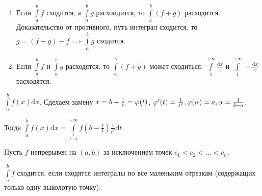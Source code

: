 \begin{remark}
    \begin{enumerate}
        \item Если  $\int\limits_a^b f$ сходится, а  $\int\limits_a^b g$ расхоидится, то  $\int\limits_a^b (f+g)$ расходится. Доказательство от противного, путь интеграл сходится, то  $g = (f+g)-f \implies \int\limits_a^b g$ сходится.
        \item Если $\int\limits_a^b f$ и  $\int\limits_a^b g$ расходятся, то  $\int\limits_a^b (f+g)$ может сходиться.  $\int\limits_1^{+\infty} \frac{\mathrm{d}x}{x}$ и $\int\limits_1^{+\infty} -\frac{\mathrm{d}x}{x}$ расходятся.
    \end{enumerate}
\end{remark}
\begin{remark}
    $\int\limits_a^b f(x) \mathrm{d}x$. Сделаем замену  $x = b - \frac{1}{t} = \varphi(t)$, $\varphi'(t) = \frac{1}{t^2}, \varphi(\alpha) = a, \alpha = \frac{1}{b-a}$.

    Тогда $\int\limits_a^b f(x) \mathrm{d}x = \int\limits_{\frac{1}{b-a}}^{+\infty} f(b-\frac{1}{t}) \frac{1}{t^2} \mathrm{d}t$.
\end{remark}

\begin{definition}
    Пусть $f$ непрерывен на  $(a, b)$ за исключением точек  $c_1 < c_2 < \ldots < c_n$.

    $\int\limits_a^b f$ сходится, если сходятся интегралы по все маленьким отрезкам (содержащих только одну выколотую точку).
\end{definition}

